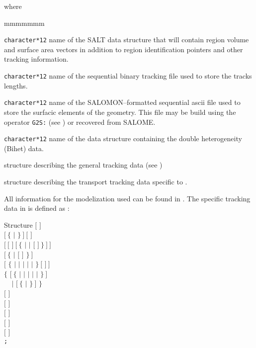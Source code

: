 \noindent  where
\begin{ListeDeDescription}{mmmmmmm}

\item[\dusa{TRKNAM}] \texttt{character*12} name of the SALT  data
structure that will contain region volume and surface area vectors in
addition to region identification pointers and other tracking information.

\item[\dusa{TRKFIL}] \texttt{character*12} name of the sequential binary tracking
file used to store the tracks lengths.

\item[\dusa{SURFIL}] \texttt{character*12} name of the SALOMON--formatted sequential {\sc ascii}
file used to store the surfacic elements of the geometry. This file may be build
using the operator {\tt G2S:} (see ) or recovered from SALOME.

\item[\dusa{GEONAM}] {\tt character*12} name of the  data
structure containing the double heterogeneity (Bihet) data.

\item[\dstr{desctrack}] structure describing the general tracking data (see
)

\item[\dstr{descsalt}] structure describing the transport tracking data
specific to .

\end{ListeDeDescription}

\vskip 0.2cm

All information for the modelization used can be found in .
The  specific tracking data in  is defined as :

\begin{DataStructure}{Structure }
$[$   $]$ \\
$[~\{$   $|$  $\}~]~[$   $]$ \\
$[~[$   $]~[~\{$  $|$  $|$  $[$  $]~\}~]~]$ \\
$[~\{$  $|$  $[$   $]$ $\}~]$ \\
$[$ $\{$   $|$  $|$  $|$  $|$  $|$  $\}~[$  $]~]$ \\
$\{$  $[~\{$  $|$  $|$  $|$  $|$  $|$  $\}~]$   \\
$~~~~~|$  $[~\{$  $|$  $\}~]$   $\}$ \\
$[$   $]$ \\
$[$  $]$\\
$[$   $]$ \\
$[$  $]$\\
$[$  $]$\\
{\tt ;}
\end{DataStructure}

